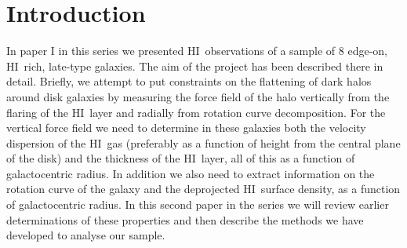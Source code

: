 \documentclass[traditabstract]{aa} %
\newcommand\HI{H{\small I}}
\begin{document}

   \maketitle
%

\section{Introduction}
In paper I \citep{ofk2008}
in this series we presented \HI\ observations of a sample of 8
edge-on, \HI\ rich, late-type galaxies. The aim of the project has been
described there in detail. Briefly, we attempt to put 
constraints on the flattening of dark halos around disk galaxies by
measuring the force field of the halo vertically from the flaring of
the \HI\ layer and radially from rotation curve decomposition. For the
vertical force field we need to determine in these galaxies both the
velocity dispersion of the \HI\ gas (preferably as a function of
height from the central plane of the disk) and the thickness of the \HI\
layer, all of this as a function of galactocentric radius. In addition
we also need to extract information on the rotation curve of the galaxy
and the deprojected
\HI\ surface density, as a function of galactocentric radius. In this
second paper in the series 
we will review earlier determinations of these properties and then describe
the methods we have developed to analyse our sample.



\end{document}
